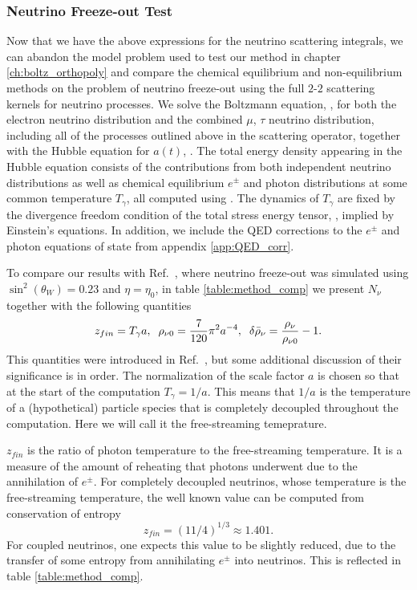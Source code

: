 
\subsubsection{ Neutrino Freeze-out Test}
Now that we have the above expressions for the neutrino scattering integrals, we can abandon the model problem used to test our method in chapter \ref{ch:boltz_orthopoly} and compare the chemical equilibrium and non-equilibrium methods on the problem of neutrino freeze-out using the full $2$-$2$ scattering kernels for neutrino processes.  We solve the Boltzmann equation, , for both the electron neutrino distribution and the combined $\mu$, $\tau$ neutrino distribution, including all of the  processes outlined above in the scattering operator, together with the Hubble equation for $a(t)$, .  The total energy density  appearing in the Hubble equation consists of the contributions from both independent neutrino distributions as well as chemical equilibrium $e^\pm$ and photon distributions at some common temperature $T_\gamma$, all computed using .  The dynamics of $T_\gamma$ are fixed by the divergence freedom condition of the total stress energy tensor, , implied by Einstein's equations.  In addition, we include the QED corrections to the $e^\pm$ and photon equations of state from appendix \ref{app:QED_corr}.



To compare our results with Ref.~\cite{Mangano2005}, where neutrino freeze-out was simulated using $\sin^2(\theta_W)=0.23$ and $\eta=\eta_0$, in table \ref{table:method_comp} we present $N_\nu$ together with the following quantities
\begin{align}
 z_{fin}=T_\gamma a,\hspace{2mm}  \rho_{\nu 0}=\frac{7}{120}\pi^2a^{-4}, \hspace{2mm}  \delta\bar\rho_{\nu}= \frac{\rho_\nu}{\rho_{\nu 0}}-1.
\end{align}
This quantities were introduced in Ref.~\cite{Mangano2005}, but some additional discussion of their significance is in order.  The normalization of the scale factor $a$ is chosen so that at the start of the computation $T_\gamma=1/a$.  This means that $1/a$ is the temperature of a (hypothetical) particle species that is completely decoupled throughout the computation.  Here we will call it the free-streaming temeprature.  

 $z_{fin}$ is the ratio of photon temperature to the free-streaming temperature.  It is a measure of the amount of reheating that photons underwent due to the annihilation of $e^\pm$.  For completely decoupled neutrinos, whose temperature is the free-streaming temperature, the well known value can be computed from conservation of entropy
\begin{equation}
z_{fin}=(11/4)^{1/3}\approx 1.401.
\end{equation}
For coupled neutrinos, one expects this value to be slightly reduced, due to the  transfer of some entropy from annihilating $e^\pm$ into neutrinos. This is reflected in table \ref{table:method_comp}.

